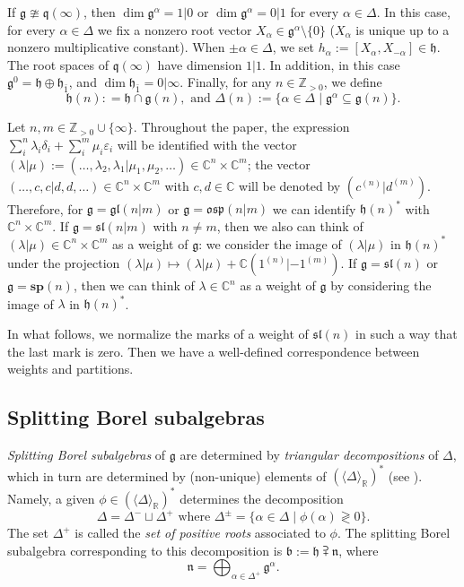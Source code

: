 \documentclass[12pt]{amsart}
\newcommand\C{\mathbb{C}}
\newcommand\Z{\mathbb{Z}}
\newcommand\R{\mathbb{R}}
\newcommand\g{\mathfrak{g}}
\newcommand\fq{\mathfrak{q}}
\newcommand\fh{\mathfrak{h}}
\newcommand\fn{\mathfrak{n}}
\newcommand\fb{\mathfrak{b}}
\newcommand\fsl{\mathfrak{sl}}
\newcommand\fosp{\mathfrak{osp}}
\newcommand\fgl{\mathfrak{gl}}
\newcommand\D{\Delta}
\newcommand\bsp{\mathbf{sp}}
\theoremstyle{plain}
\theoremstyle{definition}
\numberwithin{equation}{section}
\begin{document}
If $\g\ncong \fq(\infty)$, then $\dim \g^\alpha = 1|0$ or $\dim \g^\alpha = 0|1$ for every $\alpha\in \D$. In this case, for every $\alpha\in \D$ we fix a nonzero root vector $X_\alpha\in \g^\alpha\setminus \{0\}$ ($X_{\alpha}$ is unique up to a nonzero multiplicative constant).  When $\pm \alpha\in \D$, we set $h_\alpha:=[X_\alpha, X_{-\alpha}]\in \fh$. The root spaces of $\fq(\infty)$ have dimension $1|1$. In addition, in this case $\g^0 = \fh\oplus \fh_{\bar 1}$, and $\dim \fh_{\bar 1} = 0|\infty$. Finally, for any $n\in \Z_{>0}$, we define 
	\[
\fh(n): = \fh\cap \g(n), \text{ and } \D(n):=\{\alpha\in \D\mid \g^\alpha\subseteq \g(n)\}.
	\]
	
Let $n,m\in \Z_{>0}\cup \{\infty\}$. Throughout the paper, the expression $\sum_i^n \lambda_i\delta_i + \sum_i^m \mu_i\varepsilon_i$ will be identified with the vector $(\lambda|\mu):=(\ldots, \lambda_2, \lambda_1 | \mu_1,\mu_2,\ldots)\in \C^n\times\C^m$; the vector $(\ldots, c, c | d,d,\ldots)\in \C^n\times\C^m$ with $c,d\in \C$ will be denoted by $(c^{(n)} | d^{(m)})$. Therefore, for $\g=\fgl(n|m)$ or $\g = \fosp(n|m)$ we can identify $\fh(n)^*$ with $\C^n\times \C^m$. If $\g=\fsl(n|m)$ with $n\neq m$, then we also can think of $(\lambda | \mu)\in \C^n\times\C^m$ as a weight of $\g$: we consider the image of $(\lambda | \mu)$ in $\fh(n)^*$ under the projection $(\lambda | \mu) \mapsto (\lambda | \mu) + \C (1^{(n)}|-1^{(m)})$. If $\g =\fsl(n)$ or $\g= \bsp(n)$, then we can think of $\lambda\in \C^n$ as a weight of $\g$ by considering the image of $\lambda$ in $\fh(n)^*$.

In what follows, we normalize the marks of a weight of $\fsl(n)$ in such a way that the last mark is zero. Then we have a well-defined correspondence between weights and partitions.

\subsection{Splitting Borel subalgebras} \emph{Splitting Borel subalgebras} of $\g$ are determined by \emph{triangular decompositions} of $\D$, which in turn are determined  by (non-unique) elements of $(\langle\D\rangle_{\R})^*$ (see \cite[Proposition~2]{DP98}). Namely, a given $\phi\in (\langle\D\rangle_{\R})^*$ determines the decomposition
	\[
\D = \D^-\sqcup \D^+ \text{ where } \D^\pm = \{\alpha\in \D\mid \phi(\alpha)\gtrless 0\}.
	\]	
The set $\D^+$ is called the \emph{set of positive roots} associated to $\phi$. The splitting Borel subalgebra corresponding to this decomposition is $\fb:=\fh\supsetplus \fn$, where
	\[
\fn = \bigoplus_{\alpha\in \D^+} \g^\alpha.
	\]
\end{document}
